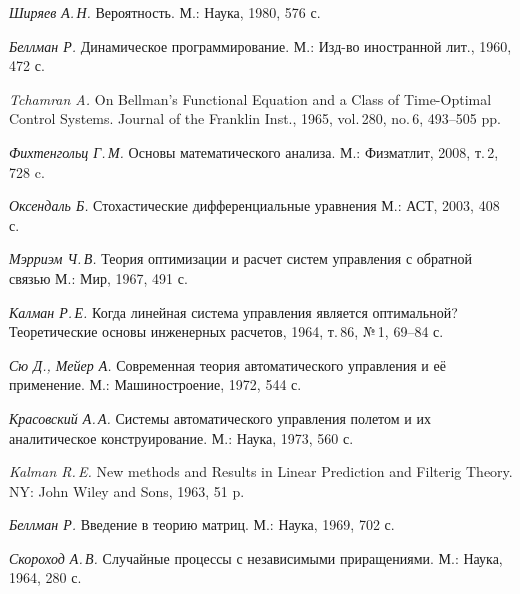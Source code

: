 
\begin{thebibliography}{wlab}


\emph{Ширяев А.\,Н.}
\newblock Вероятность.
\newblock М.: Наука, 1980, 576 с.

\emph{Беллман Р.}
\newblock Динамическое программирование.
\newblock М.: Изд-во иностранной лит., 1960, 472 с.

\emph{Tchamran A.}
\newblock On Bellman's Functional Equation and a Class of Time-Optimal Control Systems.
\newblock Journal of the Franklin Inst., 1965, vol.\,280, no.\,6, 493--505 pp.

\emph{Фихтенгольц Г.\,М.}
\newblock Основы математического анализа.
\newblock М.: Физматлит, 2008, т.\,2, 728 c.

\emph{Оксендаль Б.}
\newblock Стохастические дифференциальные уравнения
\newblock М.: АСТ, 2003, 408 с.

\emph{Мэрриэм Ч.\,В.}
\newblock Теория оптимизации и расчет систем управления с обратной связью
\newblock М.: Мир, 1967, 491 с.

\emph{Калман Р.\,Е.}
\newblock Когда линейная система управления является оптимальной?
\newblock Теоретические основы инженерных расчетов, 1964, т.\,86, №\,1, 69--84 с.

\newpage

\emph{Сю Д., Мейер А.}
\newblock Современная теория автоматического управления и её применение.
\newblock М.: Машиностроение, 1972, 544 с.

\emph{Красовский А.\,А.}
\newblock Системы автоматического управления полетом и их аналитическое конструирование.
\newblock М.: Наука, 1973, 560 с.

\emph{Kalman R.\,E.}
\newblock New methods and Results in Linear Prediction and Filterig Theory.
\newblock NY: John Wiley and Sons, 1963, 51 p.

\emph{Беллман Р.}
\newblock Введение в теорию матриц.
\newblock М.: Наука, 1969, 702 с.


\emph{Скороход А.\,В.}
\newblock Случайные процессы с независимыми приращениями.
\newblock М.: Наука, 1964, 280 с.


\end{thebibliography}
